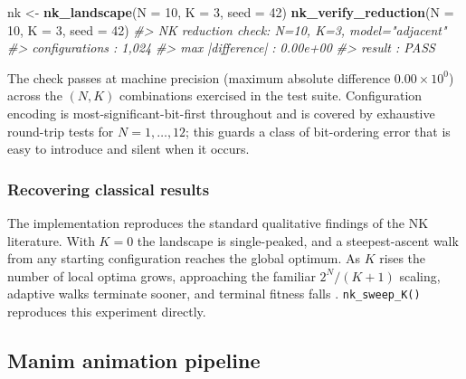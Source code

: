 \documentclass[
]{article}
\newenvironment{Shaded}{\begin{snugshade}}{\end{snugshade}}
\newcommand{\AttributeTok}[1]{\textcolor[rgb]{0.13,0.29,0.53}{#1}}
\newcommand{\CommentTok}[1]{\textcolor[rgb]{0.56,0.35,0.01}{\textit{#1}}}
\newcommand{\DecValTok}[1]{\textcolor[rgb]{0.00,0.00,0.81}{#1}}
\newcommand{\FunctionTok}[1]{\textcolor[rgb]{0.13,0.29,0.53}{\textbf{#1}}}
\newcommand{\NormalTok}[1]{#1}
\newcommand{\OtherTok}[1]{\textcolor[rgb]{0.56,0.35,0.01}{#1}}
\begin{document}
\begin{Shaded}
\begin{Highlighting}[]
\NormalTok{nk }\OtherTok{\textless{}{-}} \FunctionTok{nk\_landscape}\NormalTok{(}\AttributeTok{N =} \DecValTok{10}\NormalTok{, }\AttributeTok{K =} \DecValTok{3}\NormalTok{, }\AttributeTok{seed =} \DecValTok{42}\NormalTok{)}
\FunctionTok{nk\_verify\_reduction}\NormalTok{(}\AttributeTok{N =} \DecValTok{10}\NormalTok{, }\AttributeTok{K =} \DecValTok{3}\NormalTok{, }\AttributeTok{seed =} \DecValTok{42}\NormalTok{)}
\CommentTok{\#\textgreater{} NK reduction check: N=10, K=3, model="adjacent"}
\CommentTok{\#\textgreater{}   configurations   : 1,024}
\CommentTok{\#\textgreater{}   max |difference| : 0.00e+00}
\CommentTok{\#\textgreater{}   result           : PASS}
\end{Highlighting}
\end{Shaded}

The check passes at machine precision (maximum absolute difference
\(0.00 \times 10^{0}\)) across the \((N, K)\) combinations exercised in
the test suite. Configuration encoding is most-significant-bit-first
throughout and is covered by exhaustive round-trip tests for
\(N = 1, \ldots, 12\); this guards a class of bit-ordering error that is
easy to introduce and silent when it occurs.

\subsubsection{Recovering classical
results}\label{recovering-classical-results}

The implementation reproduces the standard qualitative findings of the
NK literature. With \(K = 0\) the landscape is single-peaked, and a
steepest-ascent walk from any starting configuration reaches the global
optimum. As \(K\) rises the number of local optima grows, approaching
the familiar \(2^N / (K+1)\) scaling, adaptive walks terminate sooner,
and terminal fitness falls
\citep{Kauffman1987, KauffmanWeinberger1989, Levinthal1997}.
\texttt{nk\_sweep\_K()} reproduces this experiment directly.

\subsection{Manim animation pipeline}\label{sec:manim}
\end{document}
